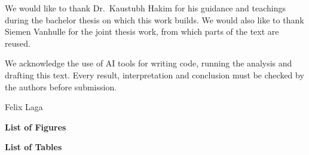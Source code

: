 \documentclass[11pt,a4paper,twocolumn]{report}
\begin{document}
\begin{frontpage}
\begin{narrowtext}
We would like to thank Dr.\ Kaustubh Hakim for his guidance and teachings during the
bachelor thesis on which this work builds. We would also like to thank Siemen Vanhulle
for the joint thesis work, from which parts of the text are reused.\par
\vspace{3pt}
We acknowledge the use of AI tools for writing code, running the analysis and drafting this
text. Every result, interpretation and conclusion must be checked by the authors before
submission.\par
\vspace{18pt}
\hfill Felix Laga
\end{narrowtext}
\end{frontpage}

\begin{frontpage}
\makeatletter{}\makeatother
\end{frontpage}

\begin{frontpage}

\end{frontpage}

\begin{frontpage}
{\noindent\bfseries\large List of Figures\par}\vspace{8pt}
\makeatletter{}\makeatother
\vspace{18pt}
{\noindent\bfseries\large List of Tables\par}\vspace{8pt}
\makeatletter{}\makeatother
\end{frontpage}

\begin{frontpage}

\end{frontpage}

\twocolumn
{}
\pagestyle{fancy}





\end{document}
